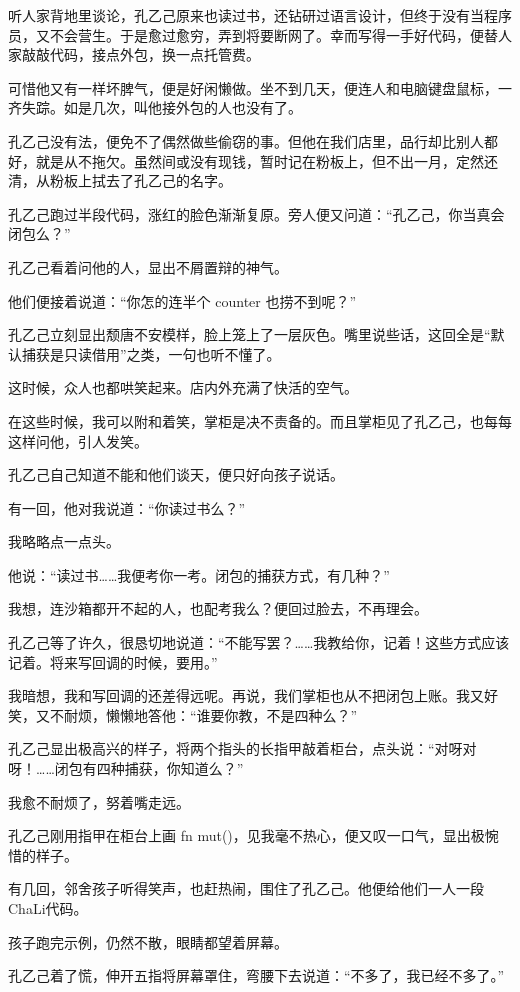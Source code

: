 听人家背地里谈论，孔乙己原来也读过书，还钻研过语言设计，但终于没有当程序员，又不会营生。于是愈过愈穷，弄到将要断网了。幸而写得一手好代码，便替人家敲敲代码，接点外包，换一点托管费。

可惜他又有一样坏脾气，便是好闲懒做。坐不到几天，便连人和电脑键盘鼠标，一齐失踪。如是几次，叫他接外包的人也没有了。

孔乙己没有法，便免不了偶然做些偷窃的事。但他在我们店里，品行却比别人都好，就是从不拖欠。虽然间或没有现钱，暂时记在粉板上，但不出一月，定然还清，从粉板上拭去了孔乙己的名字。

孔乙己跑过半段代码，涨红的脸色渐渐复原。旁人便又问道：“孔乙己，你当真会闭包么？”

孔乙己看着问他的人，显出不屑置辩的神气。

他们便接着说道：“你怎的连半个 counter 也捞不到呢？”

孔乙己立刻显出颓唐不安模样，脸上笼上了一层灰色。嘴里说些话，这回全是“默认捕获是只读借用”之类，一句也听不懂了。

这时候，众人也都哄笑起来。店内外充满了快活的空气。

在这些时候，我可以附和着笑，掌柜是决不责备的。而且掌柜见了孔乙己，也每每这样问他，引人发笑。

孔乙己自己知道不能和他们谈天，便只好向孩子说话。

有一回，他对我说道：“你读过书么？”

我略略点一点头。

他说：“读过书……我便考你一考。闭包的捕获方式，有几种？”

我想，连沙箱都开不起的人，也配考我么？便回过脸去，不再理会。

孔乙己等了许久，很恳切地说道：“不能写罢？……我教给你，记着！这些方式应该记着。将来写回调的时候，要用。”

我暗想，我和写回调的还差得远呢。再说，我们掌柜也从不把闭包上账。我又好笑，又不耐烦，懒懒地答他：“谁要你教，不是四种么？”

孔乙己显出极高兴的样子，将两个指头的长指甲敲着柜台，点头说：“对呀对呀！……闭包有四种捕获，你知道么？”

我愈不耐烦了，努着嘴走远。

孔乙己刚用指甲在柜台上画 fn mut()，见我毫不热心，便又叹一口气，显出极惋惜的样子。

有几回，邻舍孩子听得笑声，也赶热闹，围住了孔乙己。他便给他们一人一段ChaLi代码。

孩子跑完示例，仍然不散，眼睛都望着屏幕。

孔乙己着了慌，伸开五指将屏幕罩住，弯腰下去说道：“不多了，我已经不多了。”

